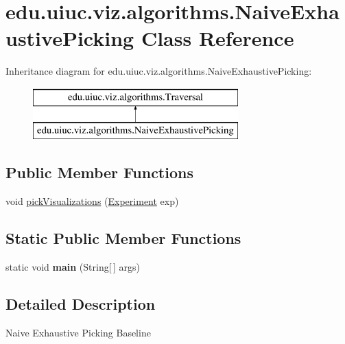 \hypertarget{classedu_1_1uiuc_1_1viz_1_1algorithms_1_1_naive_exhaustive_picking}{}\section{edu.\+uiuc.\+viz.\+algorithms.\+Naive\+Exhaustive\+Picking Class Reference}
\label{classedu_1_1uiuc_1_1viz_1_1algorithms_1_1_naive_exhaustive_picking}
Inheritance diagram for edu.\+uiuc.\+viz.\+algorithms.\+Naive\+Exhaustive\+Picking\+:\begin{figure}[H]
\begin{center}
\leavevmode
\includegraphics[height=2.000000cm]{classedu_1_1uiuc_1_1viz_1_1algorithms_1_1_naive_exhaustive_picking}
\end{center}
\end{figure}
\subsection*{Public Member Functions}
\begin{DoxyCompactItemize}
\item 
void \mbox{\hyperlink{classedu_1_1uiuc_1_1viz_1_1algorithms_1_1_naive_exhaustive_picking_a20999a527bdc67d6227300611db8d2fa}{pick\+Visualizations}} (\mbox{\hyperlink{classedu_1_1uiuc_1_1viz_1_1algorithms_1_1_experiment}{Experiment}} exp)
\end{DoxyCompactItemize}
\subsection*{Static Public Member Functions}
\begin{DoxyCompactItemize}
\item 
\mbox{\label{classedu_1_1uiuc_1_1viz_1_1algorithms_1_1_naive_exhaustive_picking_a227f03fdb08926eecf17f33f94e7f194}} 
static void {\bfseries main} (String\mbox{[}$\,$\mbox{]} args)
\end{DoxyCompactItemize}


\subsection{Detailed Description}
Naive Exhaustive Picking Baseline


